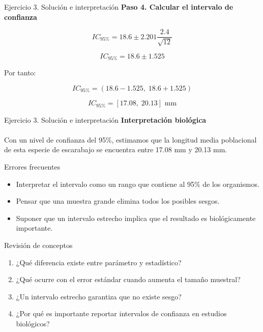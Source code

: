 \documentclass[aspectratio=169,11pt]{beamer}
\begin{document}
\begin{frame}{Ejercicio 3. Solución e interpretación}
\textbf{Paso 4. Calcular el intervalo de confianza}

\[
IC_{95\%}=18.6\pm2.201\frac{2.4}{\sqrt{12}}
\]

\[
IC_{95\%}=18.6\pm1.525
\]

Por tanto:

\[
IC_{95\%}=(18.6-1.525,\;18.6+1.525)
\]

\[
\boxed{IC_{95\%}=[17.08,\;20.13]\text{ mm}}
\]
\end{frame}

\begin{frame}{Ejercicio 3. Solución e interpretación}
\medskip
\textbf{Interpretación biológica}\\~\\

Con un nivel de confianza del 95\%, estimamos que la
longitud media poblacional de esta especie de escarabajo
se encuentra entre 17.08 mm y 20.13 mm.

\end{frame}

\begin{frame}
{Errores frecuentes}

\begin{itemize} \itemsep 1em
    \item Interpretar el intervalo como un rango que
    contiene al 95\% de los organismos.
    \item Pensar que una muestra grande elimina todos
    los posibles sesgos.
    \item Suponer que un intervalo estrecho implica
    que el resultado es biológicamente importante.
\end{itemize}

\end{frame}

\begin{frame}{Revisión de conceptos}

\begin{enumerate}[<+->] \itemsep 1em
    \item ¿Qué diferencia existe entre parámetro
    y estadístico?
    \item ¿Qué ocurre con el error estándar cuando
    aumenta el tamaño muestral?
    \item ¿Un intervalo estrecho garantiza que no
    existe sesgo?
    \item ¿Por qué es importante reportar intervalos
    de confianza en estudios biológicos?
\end{enumerate}
\end{frame}
\end{document}
